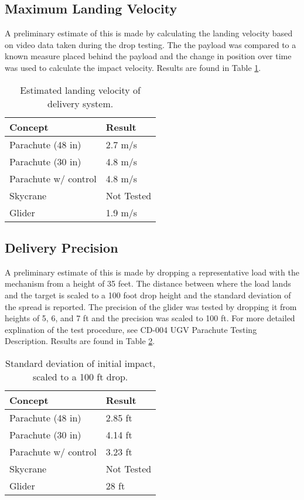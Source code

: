 \documentclass[]{auvsi_doc}
\begin{document}
	\subsection{Maximum Landing Velocity}

	
	A preliminary estimate of this is made by calculating the landing velocity based on video data taken during the drop testing. The the payload was compared to a known measure placed behind the payload and the change in position over time was used to calculate the impact velocity. Results are found in Table \ref{vel}.


	\begin{table}[!h]
	\centering

	\caption{Estimated landing velocity of delivery system.}
	\label{vel}
	\begin{tabular}{|l|l|}
		\hline
		\textbf{Concept}       & \textbf{Result} \\
		\hline
		Parachute (48 in)              &        2.7 m/s         \\
		Parachute (30 in)		&	4.8 m/s\\
		Parachute w/ control   &                4.8 m/s \\
		Skycrane               &                 Not Tested\\
		Glider                 &			1.9 m/s	 \\
		\hline
	\end{tabular}
	\end{table}

	\subsection{Delivery Precision}

	A preliminary estimate of this is made by dropping a representative load with the mechanism from a height of 35 feet. The distance between where the load lands and the target is scaled to a 100 foot drop height and the standard deviation of the spread is reported. The precision of the glider was tested by dropping it from heights of 5, 6, and 7 ft and the precision was scaled to 100 ft. For more detailed explination of the test procedure, see CD-004 UGV Parachute Testing Description. Results are found in Table \ref{precision}.

	\begin{table}[!h]
	\centering

	\caption{Standard deviation of initial impact, scaled to a 100 ft drop.}
	\label{precision}
	\begin{tabular}{|l|l|}
		\hline
		\textbf{Concept}       & \textbf{Result} \\
		\hline
		Parachute (48 in)              &        2.85 ft        \\
		Parachute (30 in)		& 4.14 ft	\\
		Parachute w/ control   &      3.23 ft           \\
		Skycrane               &            Not Tested    \\
		Glider                 &		28 ft		 \\
		\hline
	\end{tabular}
	\end{table}
\end{document}
